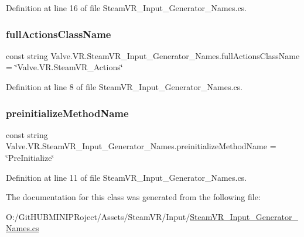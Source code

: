 Definition at line 16 of file Steam\+V\+R\+\_\+\+Input\+\_\+\+Generator\+\_\+\+Names.\+cs.

\mbox{\label{class_valve_1_1_v_r_1_1_steam_v_r___input___generator___names_aa844f01f224d95520fb08ce1c2294bc7}} 
\subsubsection{\texorpdfstring{fullActionsClassName}{fullActionsClassName}}
{\footnotesize\ttfamily const string Valve.\+V\+R.\+Steam\+V\+R\+\_\+\+Input\+\_\+\+Generator\+\_\+\+Names.\+full\+Actions\+Class\+Name = \char`\"{}Valve.\+V\+R.\+Steam\+V\+R\+\_\+\+Actions\char`\"{}}



Definition at line 8 of file Steam\+V\+R\+\_\+\+Input\+\_\+\+Generator\+\_\+\+Names.\+cs.

\mbox{\label{class_valve_1_1_v_r_1_1_steam_v_r___input___generator___names_a9e57ccfc184344787e0cba54a7985bea}} 
\subsubsection{\texorpdfstring{preinitializeMethodName}{preinitializeMethodName}}
{\footnotesize\ttfamily const string Valve.\+V\+R.\+Steam\+V\+R\+\_\+\+Input\+\_\+\+Generator\+\_\+\+Names.\+preinitialize\+Method\+Name = \char`\"{}Pre\+Initialize\char`\"{}}



Definition at line 11 of file Steam\+V\+R\+\_\+\+Input\+\_\+\+Generator\+\_\+\+Names.\+cs.



The documentation for this class was generated from the following file\+:\begin{DoxyCompactItemize}
\item 
O\+:/\+Git\+H\+U\+B\+M\+I\+N\+I\+P\+Roject/\+Assets/\+Steam\+V\+R/\+Input/\mbox{\hyperlink{_steam_v_r___input___generator___names_8cs}{Steam\+V\+R\+\_\+\+Input\+\_\+\+Generator\+\_\+\+Names.\+cs}}\end{DoxyCompactItemize}
